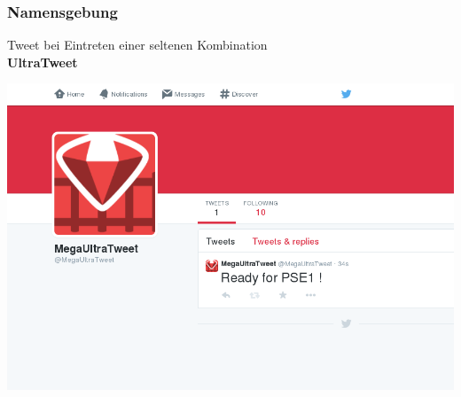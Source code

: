 \documentclass{beamer}
\begin{document}
\begin{frame}
  \frametitle{Namensgebung} \pause
  \begin{center}
    Tweet bei Eintreten einer seltenen Kombination \pause \\
    \textbf{UltraTweet}
  \end{center}
\end{frame}

\begin{frame}
  \includegraphics[width=\textwidth]{BringItOnBro}
\end{frame}
\end{document}
